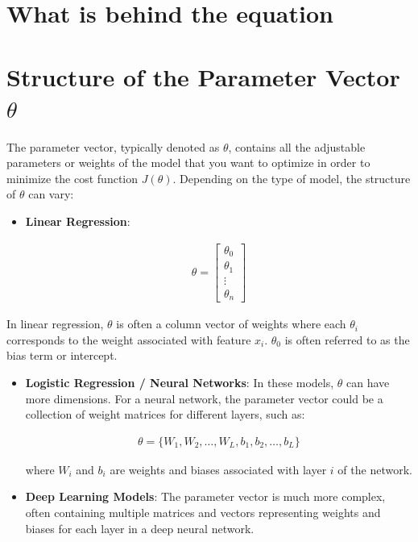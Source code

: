 \documentclass[
  12 pt,
  a4paper,
]{book}
\numberwithin{equation}{section}
\theoremstyle{plain}      %
\theoremstyle{definition} %
\theoremstyle{remark}     %
\theoremstyle{note}         %
\begin{document}
\newpage

\hypertarget{what-is-behind-the-equation}{%
\section{What is behind the
equation}\label{what-is-behind-the-equation}}

\hypertarget{structure-of-the-parameter-vector-theta}{%
\section{\texorpdfstring{Structure of the Parameter Vector
\(\theta\)}{Structure of the Parameter Vector \textbackslash theta}}\label{structure-of-the-parameter-vector-theta}}

The parameter vector, typically denoted as \(\theta\), contains all the
adjustable parameters or weights of the model that you want to optimize
in order to minimize the cost function \(J(\theta)\). Depending on the
type of model, the structure of \(\theta\) can vary:

\begin{itemize}
\item
  \textbf{Linear Regression}:

  \begin{align}
  \theta = 
  \begin{bmatrix}
  \theta_0 \\
  \theta_1 \\
  \vdots \\
  \theta_n
  \end{bmatrix}
  \end{align}
\end{itemize}

In linear regression, \(\theta\) is often a column vector of weights
where each \(\theta_i\) corresponds to the weight associated with
feature \(x_i\). \(\theta_0\) is often referred to as the bias term or
intercept.

\begin{itemize}
\item
  \textbf{Logistic Regression / Neural Networks}: In these models,
  \(\theta\) can have more dimensions. For a neural network, the
  parameter vector could be a collection of weight matrices for
  different layers, such as:

  \begin{align}
  \theta = \{ W_1, W_2, \ldots, W_L, b_1, b_2, \ldots, b_L \}
  \end{align}

  where \(W_i\) and \(b_i\) are weights and biases associated with layer
  \(i\) of the network.
\item
  \textbf{Deep Learning Models}: The parameter vector is much more
  complex, often containing multiple matrices and vectors representing
  weights and biases for each layer in a deep neural network.
\end{itemize}
\end{document}
